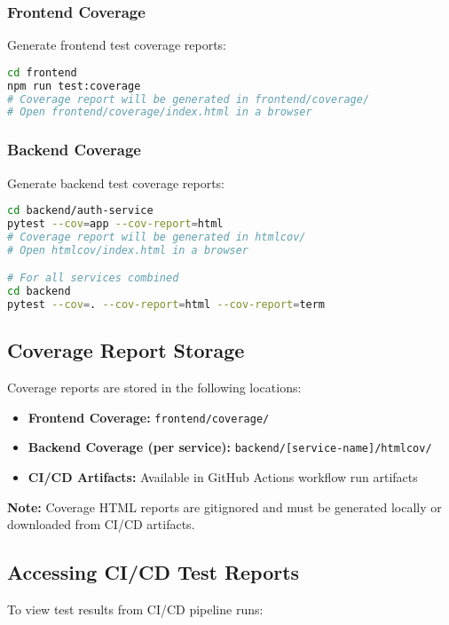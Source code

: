 \documentclass[12pt,a4paper]{article}
\begin{document}
\subsubsection{Frontend Coverage}
Generate frontend test coverage reports:

\begin{lstlisting}[language=bash]
cd frontend
npm run test:coverage
# Coverage report will be generated in frontend/coverage/
# Open frontend/coverage/index.html in a browser
\end{lstlisting}

\subsubsection{Backend Coverage}
Generate backend test coverage reports:

\begin{lstlisting}[language=bash]
cd backend/auth-service
pytest --cov=app --cov-report=html
# Coverage report will be generated in htmlcov/
# Open htmlcov/index.html in a browser

# For all services combined
cd backend
pytest --cov=. --cov-report=html --cov-report=term
\end{lstlisting}

\subsection{Coverage Report Storage}

Coverage reports are stored in the following locations:

\begin{itemize}
    \item \textbf{Frontend Coverage:} \texttt{frontend/coverage/}
    \item \textbf{Backend Coverage (per service):} \texttt{backend/[service-name]/htmlcov/}
    \item \textbf{CI/CD Artifacts:} Available in GitHub Actions workflow run artifacts
\end{itemize}

\textbf{Note:} Coverage HTML reports are gitignored and must be generated locally or downloaded from CI/CD artifacts.

\subsection{Accessing CI/CD Test Reports}

To view test results from CI/CD pipeline runs:
\end{document}

